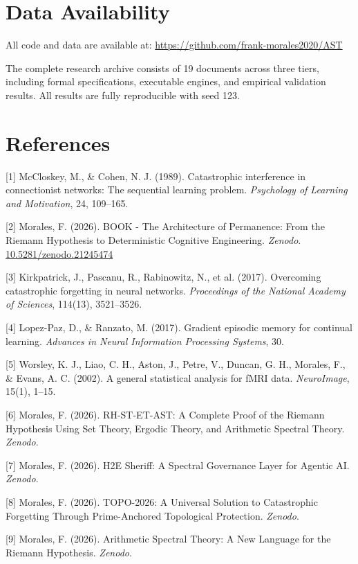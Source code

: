 \documentclass{article}
\begin{document}
\section*{Data Availability}

All code and data are available at: \url{https://github.com/frank-morales2020/AST}

The complete research archive consists of 19 documents across three tiers, including formal specifications, executable engines, and empirical validation results. All results are fully reproducible with seed 123.

\section*{References}

[1] McCloskey, M., \& Cohen, N. J. (1989). Catastrophic interference in connectionist networks: The sequential learning problem. \textit{Psychology of Learning and Motivation}, 24, 109--165.

[2] Morales, F. (2026). BOOK - The Architecture of Permanence: From the Riemann Hypothesis to Deterministic Cognitive Engineering. \textit{Zenodo}. \href{https://doi.org/10.5281/zenodo.21245474}{10.5281/zenodo.21245474}

[3] Kirkpatrick, J., Pascanu, R., Rabinowitz, N., et al. (2017). Overcoming catastrophic forgetting in neural networks. \textit{Proceedings of the National Academy of Sciences}, 114(13), 3521--3526.

[4] Lopez-Paz, D., \& Ranzato, M. (2017). Gradient episodic memory for continual learning. \textit{Advances in Neural Information Processing Systems}, 30.

[5] Worsley, K. J., Liao, C. H., Aston, J., Petre, V., Duncan, G. H., Morales, F., \& Evans, A. C. (2002). A general statistical analysis for fMRI data. \textit{NeuroImage}, 15(1), 1--15.

[6] Morales, F. (2026). RH-ST-ET-AST: A Complete Proof of the Riemann Hypothesis Using Set Theory, Ergodic Theory, and Arithmetic Spectral Theory. \textit{Zenodo}.

[7] Morales, F. (2026). H2E Sheriff: A Spectral Governance Layer for Agentic AI. \textit{Zenodo}.

[8] Morales, F. (2026). TOPO-2026: A Universal Solution to Catastrophic Forgetting Through Prime-Anchored Topological Protection. \textit{Zenodo}.

[9] Morales, F. (2026). Arithmetic Spectral Theory: A New Language for the Riemann Hypothesis. \textit{Zenodo}.
\end{document}
